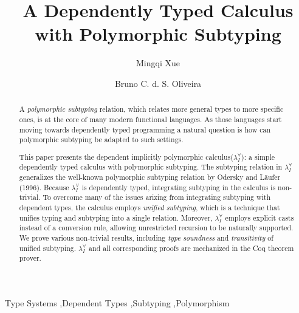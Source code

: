 \documentclass{elsarticle}
\title{A Dependently Typed Calculus with Polymorphic Subtyping}
\author{Mingqi Xue}
\author{Bruno C. d. S. Oliveira}
\newcommand{\system}[0]{the dependent implicitly polymorphic calculus\xspace}
\newcommand{\name}[0]{$\lambda_{I}^{\forall}$\xspace}
\begin{document}
\begin{abstract}
  A \emph{polymorphic subtyping} relation, which relates more general types
  to more specific ones, is at the core of many modern functional languages.
  As those languages start moving towards dependently typed programming a
  natural question is how can polymorphic subtyping be adapted to such settings.

  This paper presents \system (\name): a simple dependently typed calculus
  with polymorphic subtyping. The subtyping relation in \name
  generalizes the well-known polymorphic subtyping relation by
  Odersky and L\"aufer (1996). Because \name is dependently typed,
  integrating subtyping in the calculus is non-trivial. To overcome
  many of the issues arizing from integrating subtyping with dependent
  types, the calculus employs \emph{unified subtyping}, which is a technique
  that unifies typing and subtyping into a single relation. Moreover, \name
  employs explicit casts instead of a conversion rule, allowing
  unrestricted recursion to be naturally supported.
  We prove various non-trivial results, including \emph{type soundness} and \emph{transitivity}
  of unified subtyping. \name and all corresponding proofs
  are mechanized in the Coq theorem prover.
\end{abstract}


\begin{keyword}
  Type Systems \sep Dependent Types \sep Subtyping \sep Polymorphism
\end{keyword}

\maketitle









% 


\end{document}
